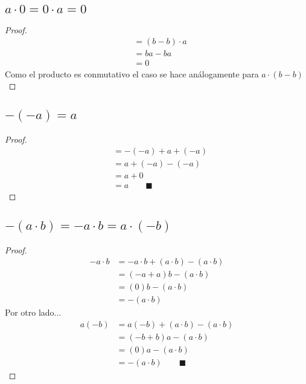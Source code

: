 \documentclass[12pt]{article}
\begin{document}
	    \subsection{$a\cdot 0 = 0\cdot a = 0$}
	        \begin{proof}
	          \begin{align}
	          \tag{Como -b es el inverso aditivo de b, la suma es 0}
	            &=  (b-b) \cdot a \\ \tag{Distributividad del producto}
	            &= ba-ba \\ \tag{Inverso aditivo}
	            &= 0
	          \end{align}
	          Como el producto es conmutativo el caso se hace análogamente para $a \cdot(b-b)$\blacksquare
	        \end{proof}
	    \subsection{$-(-a)=a$}
	        \begin{proof}
	          \begin{align}
	          \tag{Sumamos elemento neutro}
	            &=  -(-a) +a+(-a) \\ \tag{Conmutatividad}
	            &= a+(-a)-(-a)\\ \tag{Por inverso aditivo}
	            &= a+0\\ \tag{Por suma de elemento neutro}
	            &= a \qquad \blacksquare
	          \end{align}
	        \end{proof}
	    \subsection{$-(a\cdot b) = -a\cdot b = a \cdot (-b)$}
	        \begin{proof}
	          \begin{align}
	           \tag{Sumamos elemento neutro}-a\cdot b &= -a \cdot b +(a\cdot b)-(a\cdot b) \\
	           \tag{Asociatividad}&= (-a+a)b-(a\cdot b) \\
	           \tag{Inverso Aditivo} &= (0)b-(a\cdot b) \\
	           \tag{Neutro Aditivo}&= -(a \cdot b)
	          \end{align}
	          Por otro lado...
	          \begin{align}
	              \tag{Sumamos elemento neutro}a(-b) &= a(-b)+(a \cdot b)-(a \cdot b ) \\
	              \tag{Asociatividad}&= (-b+b)a-(a\cdot b) \\
	              \tag{Inverso Aditivo} &= (0)a-(a\cdot b) \\
	              \tag{Neutro Aditivo}&= -(a\cdot b) \qquad \blacksquare
	          \end{align}
	        \end{proof}
\end{document}

